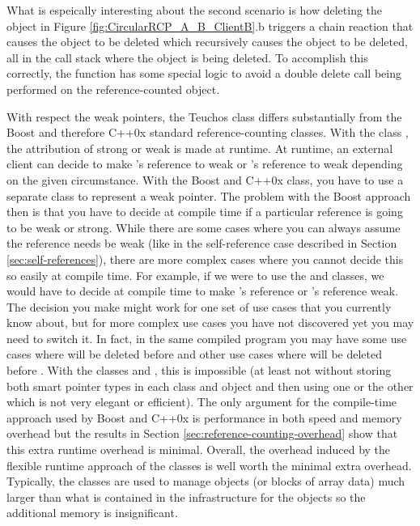 \documentclass[pdf,ps2pdf,11pt]{SANDreport}
\begin{document}
What is espeically interesting about the second scenario is how
deleting the {} object in Figure
{}\ref{fig:CircularRCP_A_B_ClientB}.b triggers a chain reaction that
causes the {} object to be deleted which recursively causes
the {} object to be deleted, all in the call stack where
the {} object is being deleted.  To accomplish this
correctly, the {} function has some
special logic to avoid a double delete call being performed on the
reference-counted object.

With respect the weak pointers, the Teuchos class {}
differs substantially from the Boost and therefore C++0x standard
reference-counting classes.  With the class {}, the
attribution of strong or weak is made at runtime.  At runtime, an
external client can decide to make {}'s reference to
{} weak or {}'s reference to {} weak
depending on the given circumstance.  With the Boost and C++0x
{} class, you have to use a separate class
{} to represent a weak pointer.  The problem with
the Boost approach then is that you have to decide at compile time if
a particular reference is going to be weak or strong.  While there are
some cases where you can always assume the reference needs be weak
(like in the self-reference case described in Section
{}\ref{sec:self-references}), there are more complex cases where you
cannot decide this so easily at compile time.  For example, if we were
to use the {} and {} classes, we
would have to decide at compile time to make {}'s reference
or {}'s reference weak.  The decision you make might work
for one set of use cases that you currently know about, but for more
complex use cases you have not discovered yet you may need to switch
it.  In fact, in the same compiled program you may have some use cases
where {} will be deleted before {} and other use
cases where {} will be deleted before {}.  With
the classes {} and {}, this is
impossible (at least not without storing both smart pointer types in
each class {} and {} object and then using one or
the other which is not very elegant or efficient).  The only argument
for the compile-time approach used by Boost and C++0x is performance
in both speed and memory overhead but the results in Section
{}\ref{sec:reference-counting-overhead} show that this extra runtime
overhead is minimal.  Overall, the overhead induced by the flexible
runtime approach of the {} classes is well worth
the minimal extra overhead.  Typically, the classes
{} are used to manage objects (or blocks of array
data) much larger than what is contained in the infrastructure for the
{} objects so the additional memory is
insignificant.
\end{document}
